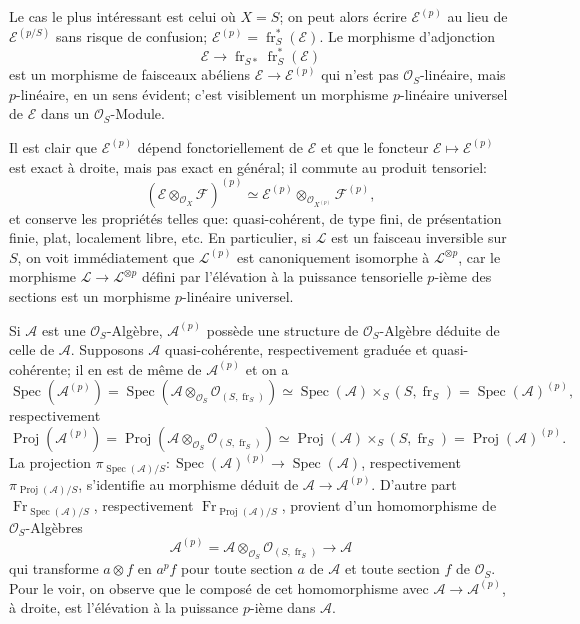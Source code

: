 \documentclass[11pt]{article}
\DeclareMathOperator{\Spec}{Spec}
\providecommand{\OO}{\mathcal{O}}
\providecommand{\cE}{\mathcal E}
\providecommand{\cF}{\mathcal F}
\providecommand{\Spec}{\operatorname{Spec}}
\providecommand{\Spec}{\operatorname{Spec}}
\providecommand{\Spec}{\operatorname{Spec}}
\providecommand{\fr}{\operatorname{fr}}
\providecommand{\Fr}{\operatorname{Fr}}
\providecommand{\Proj}{\operatorname{Proj}}
\providecommand{\cL}{\mathcal L}
\providecommand{\Fr}{\operatorname{Fr}}
\providecommand{\fr}{\operatorname{fr}}
\providecommand{\Spec}{\operatorname{Spec}}
\begin{document}
Le cas le plus intéressant est celui où $X=S$; on peut alors écrire $\cE^{(p)}$ au lieu de $\cE^{(p/S)}$ sans risque de confusion; $\cE^{(p)}=\fr_S^*(\cE)$. Le morphisme d'adjonction
\[
\cE\longrightarrow \fr_{S*}\fr_S^*(\cE)
\]
est un morphisme de faisceaux abéliens $\cE\to\cE^{(p)}$ qui n'est pas $\OO_S$-linéaire, mais $p$-linéaire, en un sens évident; c'est visiblement un morphisme $p$-linéaire universel de $\cE$ dans un $\OO_S$-Module.

Il est clair que $\cE^{(p)}$ dépend fonctoriellement de $\cE$ et que le foncteur $\cE\mapsto\cE^{(p)}$ est exact à droite, mais pas exact en général; il commute au produit tensoriel:
\[
(\cE\otimes_{\OO_X}\cF)^{(p)}\simeq
\cE^{(p)}\otimes_{\OO_{X^{(p)}}}\cF^{(p)},
\]
et conserve les propriétés telles que: quasi-cohérent, de type fini, de présentation finie, plat, localement libre, etc. En particulier, si $\cL$ est un faisceau inversible sur $S$, on voit immédiatement que $\cL^{(p)}$ est canoniquement isomorphe à $\cL^{\otimes p}$, car le morphisme $\cL\to\cL^{\otimes p}$ défini par l'élévation à la puissance tensorielle $p$-ième des sections est un morphisme $p$-linéaire universel.

Si $\mathcal{A}$ est une $\OO_S$-Algèbre, $\mathcal{A}^{(p)}$ possède une structure de $\OO_S$-Algèbre déduite de celle de $\mathcal{A}$. Supposons $\mathcal{A}$ quasi-cohérente, respectivement graduée et quasi-cohérente; il en est de même de $\mathcal{A}^{(p)}$ et on a
\[
\Spec(\mathcal{A}^{(p)})=\Spec(\mathcal{A}\otimes_{\OO_S}\OO_{(S,\fr_S)})
 \simeq \Spec(\mathcal{A})\times_S(S,\fr_S)=\Spec(\mathcal{A})^{(p)},
\]
respectivement
\[
\Proj(\mathcal{A}^{(p)})=\Proj(\mathcal{A}\otimes_{\OO_S}\OO_{(S,\fr_S)})
 \simeq \Proj(\mathcal{A})\times_S(S,\fr_S)=\Proj(\mathcal{A})^{(p)}.
\]
La projection $\pi_{\Spec(\mathcal{A})/S}:\Spec(\mathcal{A})^{(p)}\to\Spec(\mathcal{A})$, respectivement $\pi_{\Proj(\mathcal{A})/S}$, s'identifie au morphisme déduit de $\mathcal{A}\to\mathcal{A}^{(p)}$. D'autre part $\Fr_{\Spec(\mathcal{A})/S}$, respectivement $\Fr_{\Proj(\mathcal{A})/S}$, provient d'un homomorphisme de $\OO_S$-Algèbres
\[
\mathcal{A}^{(p)}=\mathcal{A}\otimes_{\OO_S}\OO_{(S,\fr_S)}\longrightarrow \mathcal{A}
\]
qui transforme $a\otimes f$ en $a^p f$ pour toute section $a$ de $\mathcal{A}$ et toute section $f$ de $\OO_S$. Pour le voir, on observe que le composé de cet homomorphisme avec $\mathcal{A}\to\mathcal{A}^{(p)}$, à droite, est l'élévation à la puissance $p$-ième dans $\mathcal{A}$.
\end{document}
